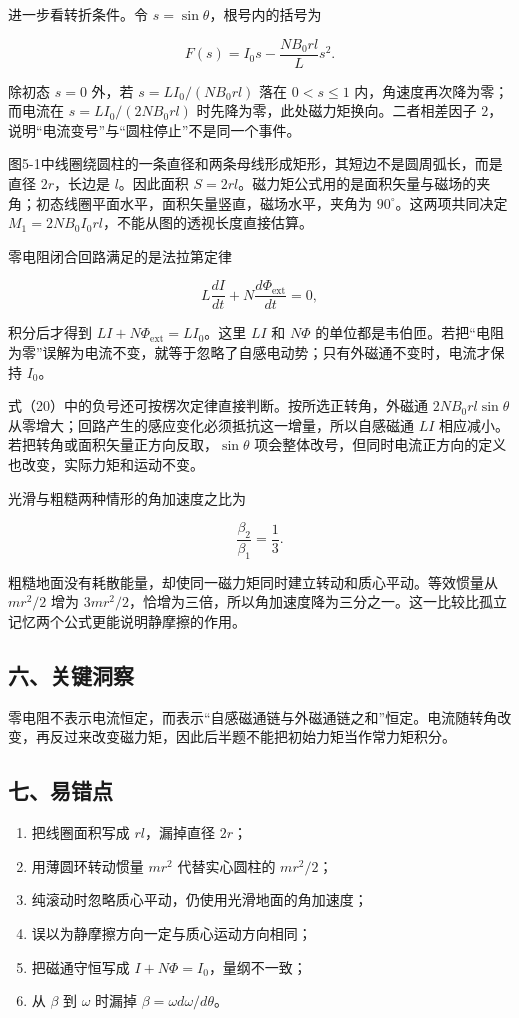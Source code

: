 \documentclass[12pt,a4paper,UTF8]{ctexart}
\newcommand{\tightlist}{\setlength{\itemsep}{0pt}\setlength{\parskip}{0pt}}
\begin{document}
进一步看转折条件。令 \(s=\sin\theta\)，根号内的括号为

\[
F(s)=I_0s-\frac{NB_0rl}{L}s^2. \tag{39}
\]

除初态 \(s=0\) 外，若 \(s=LI_0/(NB_0rl)\) 落在 \(0<s\leqslant1\)
内，角速度再次降为零；而电流在 \(s=LI_0/(2NB_0rl)\)
时先降为零，此处磁力矩换向。二者相差因子
\(2\)，说明``电流变号''与``圆柱停止''不是同一个事件。

图5-1中线圈绕圆柱的一条直径和两条母线形成矩形，其短边不是圆周弧长，而是直径
\(2r\)，长边是 \(l\)。因此面积
\(S=2rl\)。磁力矩公式用的是面积矢量与磁场的夹角；初态线圈平面水平，面积矢量竖直，磁场水平，夹角为
\(90^\circ\)。这两项共同决定
\(M_1=2NB_0I_0rl\)，不能从图的透视长度直接估算。

零电阻闭合回路满足的是法拉第定律

\[
L\frac{dI}{dt}+N\frac{d\Phi_{\mathrm{ext}}}{dt}=0,
\]

积分后才得到 \(LI+N\Phi_{\mathrm{ext}}=LI_0\)。这里 \(LI\) 和 \(N\Phi\)
的单位都是韦伯匝。若把``电阻为零''误解为电流不变，就等于忽略了自感电动势；只有外磁通不变时，电流才保持
\(I_0\)。

式（20）中的负号还可按楞次定律直接判断。按所选正转角，外磁通
\(2NB_0rl\sin\theta\)
从零增大；回路产生的感应变化必须抵抗这一增量，所以自感磁通 \(LI\)
相应减小。若把转角或面积矢量正方向反取，\(\sin\theta\)
项会整体改号，但同时电流正方向的定义也改变，实际力矩和运动不变。

光滑与粗糙两种情形的角加速度之比为

\[
\frac{\beta_2}{\beta_1}=\frac13.
\]

粗糙地面没有耗散能量，却使同一磁力矩同时建立转动和质心平动。等效惯量从
\(mr^2/2\) 增为
\(3mr^2/2\)，恰增为三倍，所以角加速度降为三分之一。这一比较比孤立记忆两个公式更能说明静摩擦的作用。

\subsection{六、关键洞察}\label{ux516dux5173ux952eux6d1eux5bdf-4}

零电阻不表示电流恒定，而表示``自感磁通链与外磁通链之和''恒定。电流随转角改变，再反过来改变磁力矩，因此后半题不能把初始力矩当作常力矩积分。

\subsection{七、易错点}\label{ux4e03ux6613ux9519ux70b9-4}

\begin{enumerate}
\def\labelenumi{\arabic{enumi}.}
\tightlist
\item
  把线圈面积写成 \(rl\)，漏掉直径 \(2r\)；
\item
  用薄圆环转动惯量 \(mr^2\) 代替实心圆柱的 \(mr^2/2\)；
\item
  纯滚动时忽略质心平动，仍使用光滑地面的角加速度；
\item
  误以为静摩擦方向一定与质心运动方向相同；
\item
  把磁通守恒写成 \(I+N\Phi=I_0\)，量纲不一致；
\item
  从 \(\beta\) 到 \(\omega\) 时漏掉 \(\beta=\omega d\omega/d\theta\)。
\end{enumerate}
\end{document}
